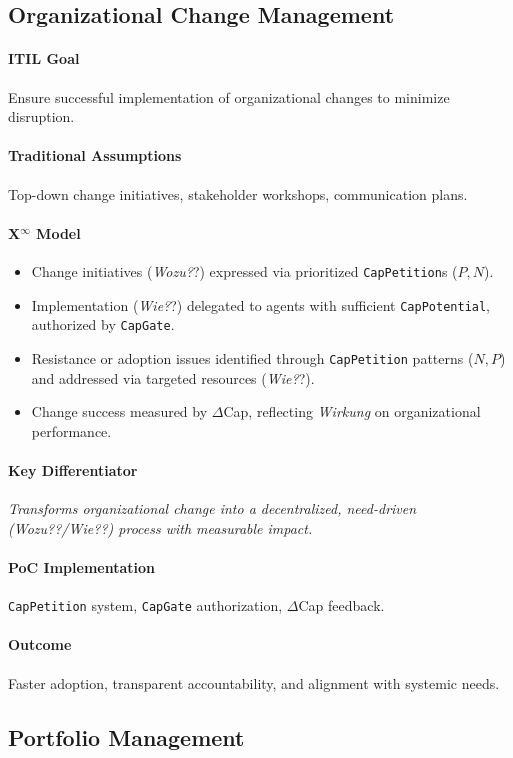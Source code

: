 \documentclass[12pt, a4paper]{scrartcl}
\newcommand{\Xinf}{X$^\infty$}                        %
\newcommand{\DeltaCap}{$\Delta$Cap}                    %
\newcommand{\CapPotential}{\texttt{CapPotential}}    %
\newcommand{\Wirkung}{\textit{Wirkung}}                 %
\newcommand{\CapGate}{\texttt{CapGate}}
\newcommand{\CapPetition}{\texttt{CapPetition}}        %
\newcommand{\Wozu}{\textit{Wozu?}}                      %
\newcommand{\Wie}{\textit{Wie?}}                        %
\begin{document}
\subsection{Organizational Change Management} %
\paragraph{ITIL Goal} Ensure successful implementation of organizational changes to minimize disruption.
\paragraph{Traditional Assumptions} Top-down change initiatives, stakeholder workshops, communication plans.
\paragraph*{\Xinf{} Model}
\begin{itemize}
    \item Change initiatives (\Wozu?) expressed via prioritized \CapPetition{}s ($P, N$).
    \item Implementation (\Wie?) delegated to agents with sufficient \CapPotential{}, authorized by \CapGate{}.
    \item Resistance or adoption issues identified through \CapPetition{} patterns ($N, P$) and addressed via targeted resources (\Wie?).
    \item Change success measured by \DeltaCap{}, reflecting \Wirkung{} on organizational performance.
\end{itemize}
\paragraph{Key Differentiator} \textit{Transforms organizational change into a decentralized, need-driven (\Wozu?/\Wie?) process with measurable impact.}
\paragraph{PoC Implementation} \CapPetition{} system, \CapGate{} authorization, \DeltaCap{} feedback.
\paragraph{Outcome} Faster adoption, transparent accountability, and alignment with systemic needs.

\subsection{Portfolio Management} %
\end{document}
